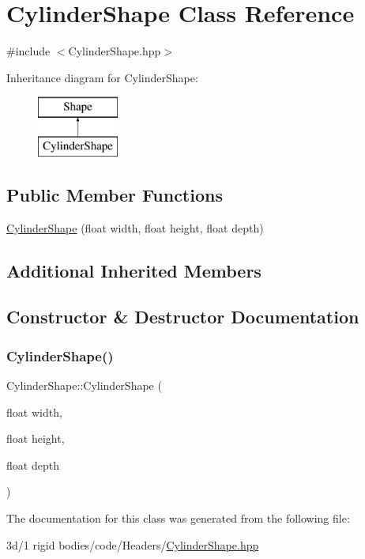 \hypertarget{class_cylinder_shape}{}\section{Cylinder\+Shape Class Reference}
\label{class_cylinder_shape}


{\ttfamily \#include $<$Cylinder\+Shape.\+hpp$>$}

Inheritance diagram for Cylinder\+Shape\+:\begin{figure}[H]
\begin{center}
\leavevmode
\includegraphics[height=2.000000cm]{class_cylinder_shape}
\end{center}
\end{figure}
\subsection*{Public Member Functions}
\begin{DoxyCompactItemize}
\item 
\mbox{\hyperlink{class_cylinder_shape_a79eaa4cbb70735ffbb23e1890e098dfc}{Cylinder\+Shape}} (float width, float height, float depth)
\end{DoxyCompactItemize}
\subsection*{Additional Inherited Members}


\subsection{Constructor \& Destructor Documentation}
\mbox{\label{class_cylinder_shape_a79eaa4cbb70735ffbb23e1890e098dfc}} 
\subsubsection{\texorpdfstring{Cylinder\+Shape()}{CylinderShape()}}
{\footnotesize\ttfamily Cylinder\+Shape\+::\+Cylinder\+Shape (\begin{DoxyParamCaption}\item[{float}]{width,  }\item[{float}]{height,  }\item[{float}]{depth }\end{DoxyParamCaption})\hspace{0.3cm}{\ttfamily [inline]}}



The documentation for this class was generated from the following file\+:\begin{DoxyCompactItemize}
\item 
3d/1 rigid bodies/code/\+Headers/\mbox{\hyperlink{_cylinder_shape_8hpp}{Cylinder\+Shape.\+hpp}}\end{DoxyCompactItemize}

